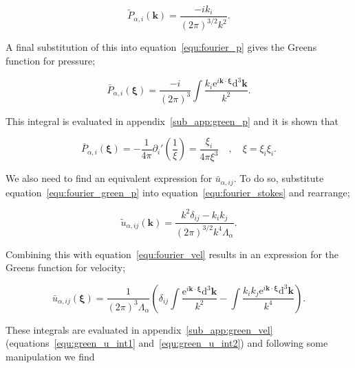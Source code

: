 \documentclass[12pt]{article}
\begin{document}
\begin{equation}
\label{equ:fourier_green_p}
\tilde{P}_{\alpha, i} (\boldsymbol{k}) = \frac{-i k_{i}}{(2 \pi)^{3/2} k^{2}}.
\end{equation}

A final substitution of this into equation~\ref{equ:fourier_p} gives the Greens function for pressure;

\begin{equation}
\label{equ:green_p_int}
\bar{P}_{\alpha, i} (\boldsymbol\xi) = \frac{-i}{(2 \pi)^{3}} \int \frac{k_{i} \mathrm{e}^{i \boldsymbol{k} \cdot \boldsymbol{\xi}} \mathrm{d}^{3} \boldsymbol{k}}{k^{2}} .
\end{equation}

This integral is evaluated in appendix~\ref{sub_app:green_p} and it is shown that

\begin{equation}
\label{equ:green_p}
\bar{P}_{\alpha, i} (\boldsymbol\xi) = -\frac{1}{4 \pi} \partial_{i}' \left(\frac{1}{\xi}\right) = \frac{\xi_{i}}{4 \pi \xi^{3}} \quad , \quad \xi = \xi_{i} \xi_{i} .
\end{equation}

We also need to find an equivalent expression for $\bar{u}_{\alpha,ij}$. To do so, substitute equation~\ref{equ:fourier_green_p} into equation~\ref{equ:fourier_stokes} and rearrange;

\begin{equation}
\label{equ:fourier_green_u}
\tilde{u}_{\alpha,ij} (\boldsymbol{k}) = \frac{k^{2} \delta_{ij} - k_{i} k_{j}}{(2 \pi)^{3/2} k^{4} \Lambda_{\alpha}} .
\end{equation}

Combining this with equation~\ref{equ:fourier_vel} results in an expression for the Greens function for velocity;

\begin{equation}
\label{equ:green_u_int}
\bar{u}_{\alpha,ij} (\boldsymbol\xi) = \frac{1}{(2 \pi)^{3} \Lambda_{\alpha}} \left(\delta_{ij} \int \frac{\mathrm{e}^{i \boldsymbol{k} \cdot \boldsymbol\xi} \mathrm{d}^{3} \boldsymbol{k}}{k^{2}} - \int \frac{k_{i} k_{j} \mathrm{e}^{i \boldsymbol{k} \cdot \boldsymbol\xi} \mathrm{d}^{3} \boldsymbol{k}}{k^{4}} \right).
\end{equation}

These integrals are evaluated in appendix~\ref{sub_app:green_vel} (equations~\ref{equ:green_u_int1} and~\ref{equ:green_u_int2}) and following some manipulation we find
\end{document}
